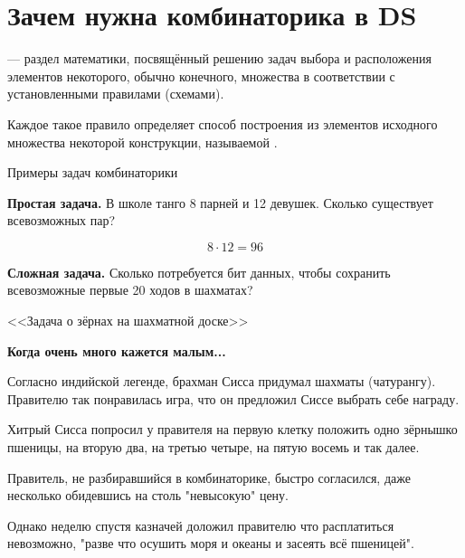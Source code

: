 \section{Зачем нужна комбинаторика в DS}\label{section:why_combinatorics}
\begin{frame}
 — раздел математики, посвящённый 
решению задач выбора и расположения элементов некоторого, обычно конечного, множества
в соответствии с установленными правилами (схемами). 

Каждое такое правило определяет способ построения из элементов исходного множества некоторой конструкции, 
называемой . 
\end{frame}


\begin{frame}{Примеры задач комбинаторики}

\textbf{Простая задача.}
В школе танго 8 парней 
и 12 девушек.
Сколько существует всевозможных пар?

\begin{equation*}
8 \cdot 12 = 96
\end{equation*}

\textbf{Сложная задача.}
Сколько потребуется бит данных, 
чтобы сохранить всевозможные первые 20 ходов в шахматах?
\end{frame}


\begin{frame}{<<Задача о зёрнах на шахматной доске>>}
	
	\textbf{Когда очень много кажется малым...}
	
	Согласно индийской легенде, 
	брахман Сисса придумал шахматы (чатурангу).
	Правителю так понравилась игра, что он предложил Сиссе 
	выбрать себе награду.
	
	Хитрый Сисса попросил у правителя 
	на первую клетку положить одно зёрнышко пшеницы,
	на вторую два, 
	на третью четыре,
	на пятую восемь и так далее.
	
	Правитель, не разбиравшийся в комбинаторике,
	быстро согласился, даже несколько 
	обидевшись на столь "невысокую" цену.
	
	Однако неделю спустя 
	казначей доложил правителю что расплатиться невозможно,
	"разве что осушить моря и океаны и засеять всё пшеницей".
	
\end{frame}

